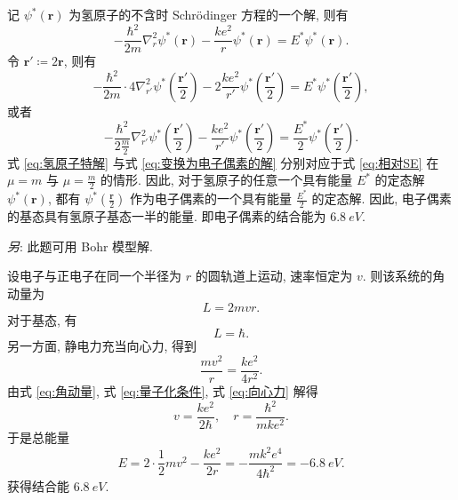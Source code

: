 \documentclass{article}
\begin{document}
记 $\psi^*\!\left(\mathbf r\right)$ 为氢原子的不含时 Schrödinger 方程的一个解,
则有
\begin{equation}
	\label{eq:氢原子特解}
	-\frac{\hbar^2}{2m}\nabla_r^2\psi^*\!\left(\mathbf r\right)-\frac{ke^2}{r}\psi^*\!\left(\mathbf r\right)=E^*\psi^*\!\left(\mathbf r\right).
\end{equation}
令 $\mathbf r'\coloneqq2\mathbf r$, 则有
\begin{equation}
	-\frac{\hbar^2}{2m}\cdot4\nabla_{r'}^2\psi^*\!\left(\frac{\mathbf r'}2\right)-2\frac{ke^2}{r'}\psi^*\!\left(\frac{\mathbf r'}2\right)=E^*\psi^*\!\left(\frac{\mathbf r'}2\right),
\end{equation}
或者
\begin{equation}
	\label{eq:变换为电子偶素的解}
	-\frac{\hbar^2}{2\frac m2}\nabla_{r'}^2\psi^*\!\left(\frac{\mathbf r'}2\right)-\frac{ke^2}{r'}\psi^*\!\left(\frac{\mathbf r'}2\right)=\frac{E^*}2\psi^*\!\left(\frac{\mathbf r'}2\right).
\end{equation}
式 \ref{eq:氢原子特解} 与式 \ref{eq:变换为电子偶素的解} 分别对应于式 \ref{eq:相对SE} 在 $\mu=m$ 与 $\mu=\frac m2$ 的情形.
因此, 对于氢原子的任意一个具有能量 $E^*$ 的定态解 $\psi^*\!\left(\mathbf r\right)$,
都有 $\psi^*\!\left(\frac{\mathbf r}2\right)$ 作为电子偶素的一个具有能量 $\frac{E^*}2$ 的定态解.
因此, 电子偶素的基态具有氢原子基态一半的能量.
即电子偶素的结合能为 $\SI{6.8}{eV}$.

\textit{另}: 此题可用 Bohr 模型解.

设电子与正电子在同一个半径为 $r$ 的圆轨道上运动, 速率恒定为 $v$.
则该系统的角动量为
\begin{equation}
	\label{eq:角动量}
	L=2mvr.
\end{equation}
对于基态, 有
\begin{equation}
	\label{eq:量子化条件}
	L=\hbar.
\end{equation}
另一方面, 静电力充当向心力, 得到
\begin{equation}
	\label{eq:向心力}
	\frac{mv^2}r=\frac{ke^2}{4r^2}.
\end{equation}
由式 \ref{eq:角动量}, 式 \ref{eq:量子化条件}, 式 \ref{eq:向心力} 解得
\begin{equation}
	v=\frac{ke^2}{2\hbar},\quad r=\frac{\hbar^2}{mke^2}.
\end{equation}
于是总能量
\begin{equation}
	E=2\cdot\frac12mv^2-\frac{ke^2}{2r}=-\frac{mk^2e^4}{4\hbar^2}=-\SI{6.8}{eV}.
\end{equation}
获得结合能 $\SI{6.8}{eV}$.
\end{document}
